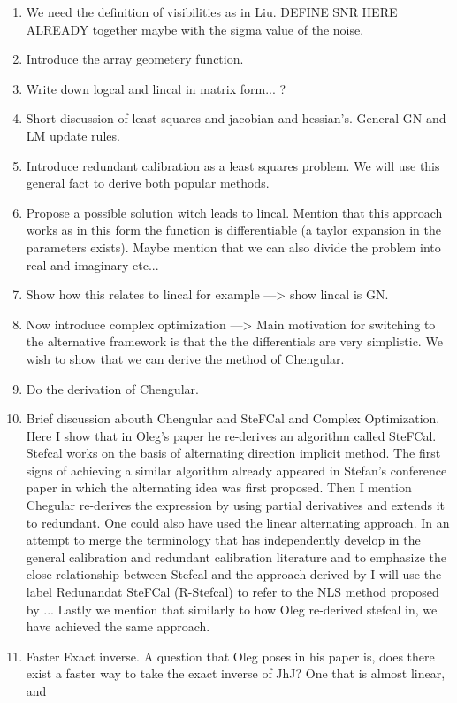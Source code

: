 \documentclass[a4paper,fleqn,usenatbib]{mnras}
\begin{document}
\begin{enumerate}
 \begin{enumerate}
 \item We need the definition of visibilities as in Liu. DEFINE SNR HERE ALREADY together maybe with the sigma value of the noise.
 \item Introduce the array geometery function.
 \item Write down logcal and lincal in matrix form... ?
 \item Short discussion of least squares and jacobian and hessian's. General GN and LM update rules.
 \item Introduce redundant calibration as a least squares problem. We will use this general fact to derive both popular methods.
 \item Propose a possible solution witch leads to lincal. Mention that this approach works as in this form the function is differentiable (a taylor expansion in the 
 parameters exists). Maybe mention that we can also divide the problem into real and imaginary etc...
 \item Show how this relates to lincal for example ---> show lincal is GN.
 \item Now introduce complex optimization ---> Main motivation for switching to the alternative framework is that the the differentials are very simplistic. We wish to show that
 we can derive the method of Chengular.
 \item Do the derivation of Chengular. 
 \item Brief discussion abouth Chengular and SteFCal and Complex Optimization. Here I show that in Oleg's paper he re-derives an algorithm called SteFCal. Stefcal works
 on the basis of alternating direction implicit method. The first signs of achieving a similar algorithm already appeared in Stefan's conference paper in which the alternating
 idea was first proposed. Then I mention Chegular re-derives the expression by using partial derivatives and extends it to redundant. One could also have used the linear alternating
 approach. In an attempt to merge the terminology that has independently develop in the general calibration and redundant calibration literature and to emphasize the close
 relationship between Stefcal and the approach derived by I will use the label Redunandat SteFCal (R-Stefcal) to refer to the NLS method proposed by ... Lastly we mention that similarly
 to how Oleg re-derived stefcal in, we have achieved the same approach.
 \item Faster Exact inverse. A question that Oleg poses in his paper is, does there exist a faster way to take the exact inverse of JhJ? One that is almost linear, and

\end{enumerate}
\end{enumerate}
\end{document}

